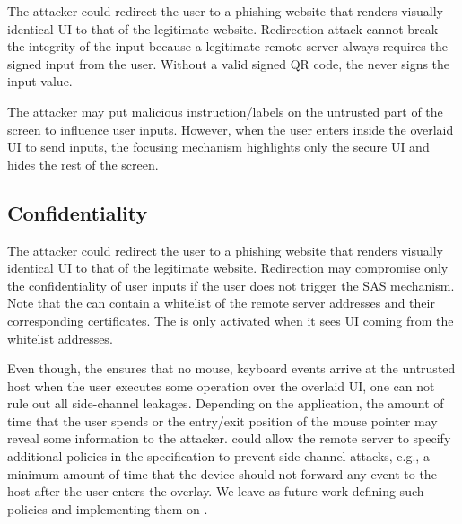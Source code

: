 The attacker could redirect the user to a phishing website that renders visually identical UI to that of the legitimate website. Redirection attack cannot break the integrity of the input because a legitimate remote server always requires the signed input from the user. Without a valid signed QR code, the \device never signs the input value. 

 The attacker may put malicious instruction/labels on the untrusted part of the screen to influence user inputs. However, when the user enters inside the overlaid UI to send inputs, the focusing mechanism highlights only the secure UI and hides the rest of the screen. 

\subsection{Confidentiality}

 The attacker could redirect the user to a phishing website that renders visually identical UI to that of the legitimate website. Redirection may compromise only the confidentiality of user inputs if the user does not trigger the SAS mechanism. Note that the \device can contain a whitelist of the remote server addresses and their corresponding certificates. The \device is only activated when it sees UI coming from the whitelist addresses.

 Even though, the \device ensures that no mouse, keyboard events arrive at the untrusted host when the user executes some operation over the overlaid UI, one can not rule out all side-channel leakages. Depending on the application, the amount of time that the user spends or the entry/exit position of the mouse pointer may reveal some information to the attacker. 
\device could allow the remote server to specify additional policies in the specification to prevent side-channel attacks, e.g., a minimum amount of time that the device should not forward any event to the host after the user enters the overlay. We leave as future work defining such policies and implementing them on \name.

